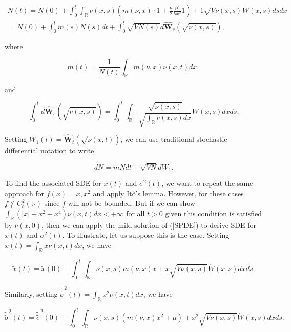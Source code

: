 \documentclass[]{elsarticle} %
\begin{document}
\begin{multline}
N(t)=N(0)+\int_0^t\int_\mathbb{R}\nu(x,s)\left(m(\nu,x)\cdot1+\frac{\mu}{2}\frac{\partial^2}{\partial x^2}1\right)+1\sqrt{V\nu(x,s)}\dot W(x,s)dsdx \\
=N(0)+\int_0^t\bar m(s)N(s)dt+\int_0^t\sqrt{VN(s)}d\hat{\mathbf{W}}_s(\sqrt{\nu(x,s)}),
\end{multline}

where

\begin{equation}
\bar m(t)=\frac{1}{N(t)}\int_\mathbb{R}m(\nu,x)\nu(x,t)dx,
\end{equation}

and

\begin{equation}
\int_0^td\hat{\mathbf{W}}_s(\sqrt{\nu(x,s)})=\int_0^t\int_\mathbb{R}\frac{\sqrt{\nu(x,s)}}{\sqrt{\int_\mathbb{R}\nu(x,s)dx}}\dot W(x,s)dxds.
\end{equation}

Setting \(W_1(t)=\hat{\mathbf{W}}_t(\sqrt{\nu(x,t)})\), we can use
traditional stochastic differential notation to write

\begin{equation}
dN=\bar mNdt+\sqrt{VN}dW_1.
\end{equation}

To find the associated SDE for \(\bar x(t)\) and \(\sigma^2(t)\), we
want to repeat the same approach for \(f(x)=x,x^2\) and apply Itô's
lemma. However, for these cases \(f\notin C^2_b(\mathbb{R})\) since
\(f\) will not be bounded. But if we can show
\(\int_\mathbb{R}(|x|+x^2+x^4)\nu(x,t)dx<+\infty\) for all \(t>0\) given
this condition is satisfied by \(\nu(x,0)\), then we can apply the mild
solution of (\ref{SPDE}) to derive SDE for \(\bar x(t)\) and
\(\sigma^2(t)\). To illustrate, let us suppose this is the case. Setting
\(\tilde x(t)=\int_\mathbb{R}x\nu(x,t)dx\), we have

\begin{equation}
\tilde x(t)=\tilde x(0)+\int_0^t\int_\mathbb{R}\nu(x,s)m(\nu,x)x+x\sqrt{V\nu(x,s)}\dot W(x,s)dxds.
\end{equation}

Similarly, setting
\(\tilde{\tilde\sigma}^2(t)=\int_\mathbb{R}x^2\nu(x,t)dx\), we have

\begin{equation}
\tilde{\tilde\sigma}^2(t)=\tilde{\tilde\sigma}^2(0)+\int_0^t\int_\mathbb{R}\nu(x,s)\left(m(\nu,x)x^2+\mu\right)+x^2\sqrt{V\nu(x,s)}\dot W(x,s)dxds.
\end{equation}
\end{document}
